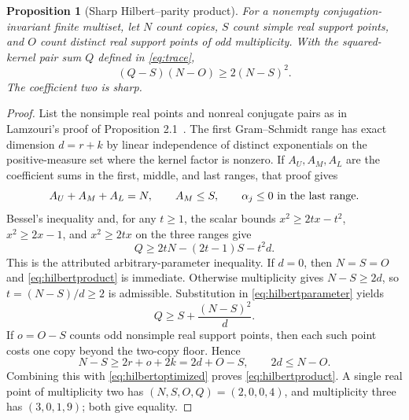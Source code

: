 ﻿\documentclass[11pt]{article}
\newtheorem{proposition}[theorem]{Proposition}
\theoremstyle{remark}
\begin{document}
\begin{proposition}[Sharp Hilbert--parity product]\label{prop:hilbertproduct}
For a nonempty conjugation-invariant finite multiset, let $N$ count copies,
$S$ count simple real support points, and $O$ count distinct real support
points of odd multiplicity. With the squared-kernel pair sum $Q$ defined in
\eqref{eq:trace},
\begin{equation}\label{eq:hilbertproduct}
 (Q-S)(N-O)\ge2(N-S)^2.
\end{equation}
The coefficient two is sharp.
\end{proposition}
\begin{proof}
List the nonsimple real points and nonreal conjugate pairs as in Lamzouri's
proof of Proposition 2.1~\cite{Lamzouri}. The first Gram--Schmidt range has
exact dimension $d=r+k$ by linear independence of distinct exponentials on
the positive-measure set where the kernel factor is nonzero. If
$A_U,A_M,A_L$ are the coefficient sums in the first, middle, and last ranges,
that proof gives
\[
 A_U+A_M+A_L=N,\qquad A_M\le S,
 \qquad \alpha_j\le0\ \hbox{in the last range}.
\]
Bessel's inequality and, for any $t\ge1$, the scalar bounds
$x^2\ge2tx-t^2$, $x^2\ge2x-1$, and $x^2\ge2tx$ on the three ranges give
\begin{equation}\label{eq:hilbertparameter}
 Q\ge2tN-(2t-1)S-t^2d.
\end{equation}
This is the attributed arbitrary-parameter inequality. If $d=0$, then
$N=S=O$ and \eqref{eq:hilbertproduct} is immediate. Otherwise multiplicity
gives $N-S\ge2d$, so $t=(N-S)/d\ge2$ is admissible. Substitution in
\eqref{eq:hilbertparameter} yields
\begin{equation}\label{eq:hilbertoptimized}
 Q\ge S+\frac{(N-S)^2}{d}.
\end{equation}
If $o=O-S$ counts odd nonsimple real support points, then each such point
costs one copy beyond the two-copy floor. Hence
\[
 N-S\ge2r+o+2k=2d+O-S,
 \qquad 2d\le N-O.
\]
Combining this with \eqref{eq:hilbertoptimized} proves
\eqref{eq:hilbertproduct}. A single real point of multiplicity two has
$(N,S,O,Q)=(2,0,0,4)$, and multiplicity three has $(3,0,1,9)$; both give
equality.
\end{proof}
\end{document}
